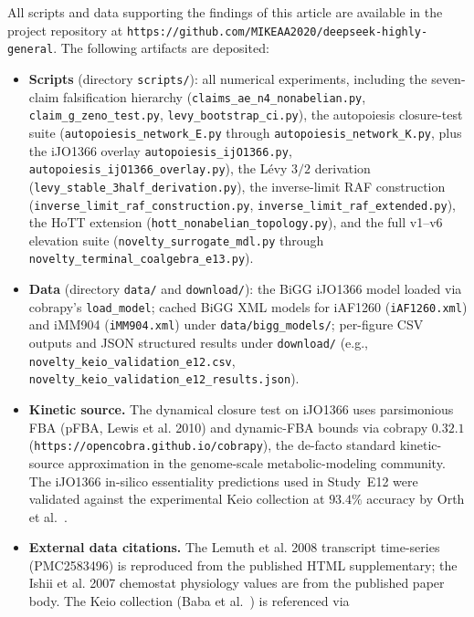 \documentclass[11pt,a4paper]{article}
\theoremstyle{plain}
\theoremstyle{definition}
\theoremstyle{remark}
\begin{document}
All scripts and data supporting the findings of this article are
available in the project repository at
\texttt{https://github.com/MIKEAA2020/deepseek-highly-general}. The
following artifacts are deposited:

\begin{itemize}
\item \textbf{Scripts} (directory \texttt{scripts/}): all numerical
  experiments, including the seven-claim falsification hierarchy
  (\texttt{claims\_ae\_n4\_nonabelian.py}, \texttt{claim\_g\_zeno\_test.py},
  \texttt{levy\_bootstrap\_ci.py}), the autopoiesis closure-test suite
  (\texttt{autopoiesis\_network\_E.py} through
  \texttt{autopoiesis\_network\_K.py}, plus the iJO1366 overlay
  \texttt{autopoiesis\_ijO1366.py}, \texttt{autopoiesis\_ijO1366\_overlay.py}),
  the L\'evy $3/2$ derivation
  (\texttt{levy\_stable\_3half\_derivation.py}), the inverse-limit RAF
  construction (\texttt{inverse\_limit\_raf\_construction.py},
  \texttt{inverse\_limit\_raf\_extended.py}), the HoTT extension
  (\texttt{hott\_nonabelian\_topology.py}), and the full v1--v6
  elevation suite (\texttt{novelty\_surrogate\_mdl.py} through
  \texttt{novelty\_terminal\_coalgebra\_e13.py}).
\item \textbf{Data} (directory \texttt{data/} and \texttt{download/}):
  the BiGG iJO1366 model loaded via cobrapy's \texttt{load\_model};
  cached BiGG XML models for iAF1260 (\texttt{iAF1260.xml}) and
  iMM904 (\texttt{iMM904.xml}) under \texttt{data/bigg\_models/}; per-figure
  CSV outputs and JSON structured results under
  \texttt{download/} (e.g., \texttt{novelty\_keio\_validation\_e12.csv},
  \texttt{novelty\_keio\_validation\_e12\_results.json}).
\item \textbf{Kinetic source.} The dynamical closure test on iJO1366
  uses parsimonious FBA (pFBA, Lewis et al. 2010) and dynamic-FBA
  bounds via cobrapy $0.32.1$ (\texttt{https://opencobra.github.io/cobrapy}),
  the de-facto standard kinetic-source approximation in the
  genome-scale metabolic-modeling community. The iJO1366 in-silico
  essentiality predictions used in Study~E12 were validated against
  the experimental Keio collection at $93.4\%$ accuracy by
  Orth et al.~\cite{orth2011ijo1366}.
\item \textbf{External data citations.} The Lemuth et al. 2008
  transcript time-series (PMC2583496) is reproduced from the
  published HTML supplementary; the Ishii et al. 2007 chemostat
  physiology values are from the published paper body. The Keio
  collection (Baba et al.~\cite{baba2006keio}) is referenced via

\end{itemize}
\end{document}
